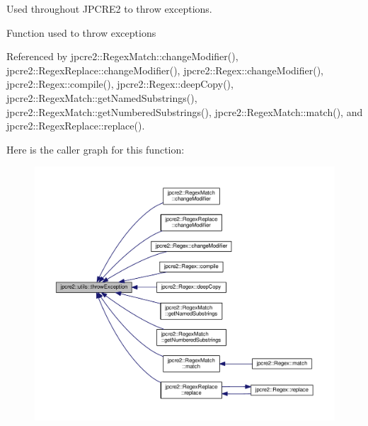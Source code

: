 Used throughout J\+P\+C\+R\+E2 to throw exceptions. 

Function used to throw exceptions 

Referenced by jpcre2\+::\+Regex\+Match\+::change\+Modifier(), jpcre2\+::\+Regex\+Replace\+::change\+Modifier(), jpcre2\+::\+Regex\+::change\+Modifier(), jpcre2\+::\+Regex\+::compile(), jpcre2\+::\+Regex\+::deep\+Copy(), jpcre2\+::\+Regex\+Match\+::get\+Named\+Substrings(), jpcre2\+::\+Regex\+Match\+::get\+Numbered\+Substrings(), jpcre2\+::\+Regex\+Match\+::match(), and jpcre2\+::\+Regex\+Replace\+::replace().



Here is the caller graph for this function\+:\nopagebreak
\begin{figure}[H]
\begin{center}
\leavevmode
\includegraphics[width=350pt]{namespacejpcre2_1_1utils_ae46ee8a2fbb7bc5b583aee0d1f047052_icgraph}
\end{center}
\end{figure}


